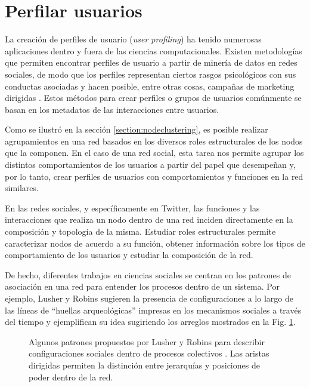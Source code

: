\section{Perfilar usuarios}\label{sec:proposal:users}
 La creación de perfiles de usuario (\textit{user profiling}) ha tenido numerosas aplicaciones dentro y fuera de las ciencias computacionales. Existen metodologías que permiten encontrar perfiles de usuario a partir de minería de datos en redes sociales, de modo que los perfiles representan ciertos rasgos psicológicos con sus conductas asociadas y hacen posible, entre otras cosas, campañas de marketing dirigidas \cite{hu_cambridge_2020}. Estos métodos para crear perfiles o grupos de usuarios comúnmente se basan en los metadatos de las interacciones entre usuarios.
 
Como se ilustró en la sección \ref{section:nodeclustering}, es posible realizar agrupamientos en una red basados en los diversos roles estructurales de los nodos que la componen. En el caso de una red social, esta tarea nos permite agrupar los distintos comportamientos de los usuarios a partir del papel que desempeñan y, por lo tanto, crear perfiles de usuarios con comportamientos y funciones en la red similares.
 
En las redes sociales, y específicamente en Twitter, las funciones y las interacciones que realiza un nodo dentro de una red inciden directamente en la composición y topología de la misma. Estudiar roles estructurales permite caracterizar nodos de acuerdo a su función, obtener información sobre los tipos de comportamiento de los usuarios y estudiar la composición de la red.

De hecho, diferentes trabajos en ciencias sociales se centran en los patrones de asociación en una red para entender los procesos dentro de un sistema. Por ejemplo, Lusher y Robins sugieren la presencia de configuraciones a lo largo de las líneas de \enquote{huellas arqueológicas} impresas en los mecanismos sociales a través del tiempo y ejemplifican su idea sugiriendo los arreglos mostrados en la Fig. \ref{fig:lusher}.

\begin{figure}[htbp]
  \centering
  
    \caption{Algunos patrones propuestos por Lusher y Robins para describir configuraciones sociales dentro de procesos colectivos \citep{lusher_exponential_nodate}. Las aristas dirigidas permiten la distinción entre jerarquías y posiciones de poder dentro de la red.}
    \label{fig:lusher}
\end{figure}

